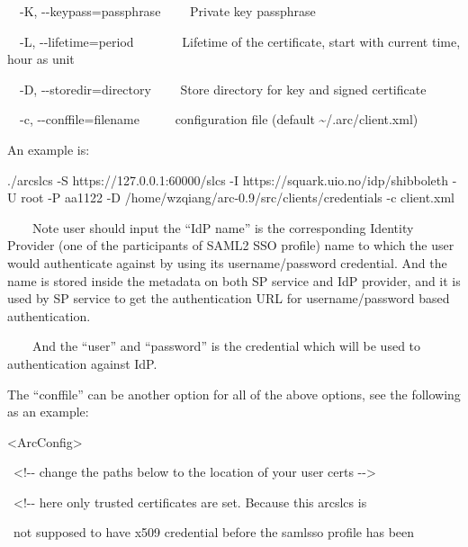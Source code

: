 \documentclass{article}
\begin{document}
{\color{black}
\ \ {}-K, -{}-keypass=passphrase \ \ \ \ Private key passphrase }

{\color{black}
\ \ {}-L, -{}-lifetime=period \ \ \ \ \ \ \ Lifetime of the certificate,
start with current time, hour as unit }

{\color{black}
\ \ {}-D, -{}-storedir=directory \ \ \ \ Store directory for key and
signed certificate}

{\color{black}
\ \ {}-c, -{}-conffile=filename \ \ \ \ \ configuration file (default
\~{}/.arc/client.xml) }

{\color{black}
An example is:}

{\color{black}
./arcslcs -S https://127.0.0.1:60000/slcs -I
https://squark.uio.no/idp/shibboleth -U root -P aa1122 -D
/home/wzqiang/arc-0.9/src/clients/credentials -c client.xml }

{\color{black}
\ \ \ \ Note user should input the {\textquotedblleft}IdP
name{\textquotedblright} is the corresponding Identity Provider (one of
the participants of SAML2 SSO profile) name to which the user would
authenticate against by using its username/password credential. And the
name is stored inside the metadata on both SP service and IdP provider,
and it is used by SP service to get the authentication URL for
username/password based authentication.}

{\color{black}
\ \ \ \ And the {\textquotedblleft}user{\textquotedblright} and
{\textquotedblleft}password{\textquotedblright} is the credential which
will be used to authentication against IdP.}

{\color{black}
The {\textquotedblleft}conffile{\textquotedblright} can be another
option for all of the above options, see the following as an example:}

{\ttfamily\color{black}
{\textless}ArcConfig{\textgreater} }

{\ttfamily\color{black}
\ {\textless}!-{}- change the paths below to the location of your user
certs -{}-{\textgreater} }

{\ttfamily\color{black}
\ {\textless}!-{}- here only trusted certificates are set. Because this
arcslcs is }

{\ttfamily\color{black}
\ not supposed to have x509 credential before the samlsso profile has
been }
\end{document}
